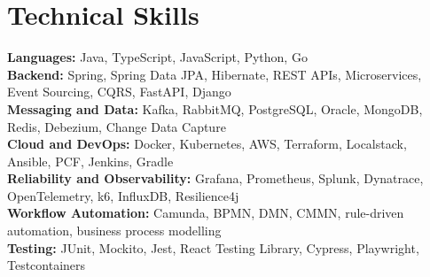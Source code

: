 \documentclass[letterpaper,11pt]{article}
\begin{document}
\section{Technical Skills}
\vspace{-7pt}
\begin{itemize}
[leftmargin=0.15in, label={}]\small{\item{
\textbf{Languages:} Java, TypeScript, JavaScript, Python, Go \\
\textbf{Backend:} Spring, Spring Data JPA, Hibernate, REST APIs, Microservices, Event Sourcing, CQRS, FastAPI, Django \\
\textbf{Messaging and Data:} Kafka, RabbitMQ, PostgreSQL, Oracle, MongoDB, Redis, Debezium, Change Data Capture \\
\textbf{Cloud and DevOps:} Docker, Kubernetes, AWS, Terraform, Localstack, Ansible, PCF, Jenkins, Gradle \\
\textbf{Reliability and Observability:} Grafana, Prometheus, Splunk, Dynatrace, OpenTelemetry, k6, InfluxDB, Resilience4j \\
\textbf{Workflow Automation:} Camunda, BPMN, DMN, CMMN, rule-driven automation, business process modelling \\
\textbf{Testing:} JUnit, Mockito, Jest, React Testing Library, Cypress, Playwright, Testcontainers
}}
\end{itemize}
\end{document}
